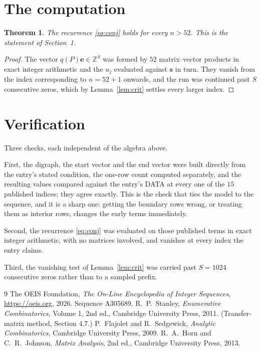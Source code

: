 \documentclass[11pt,a4paper]{article}
\theoremstyle{plain}
\newtheorem{theorem}{Theorem}
\theoremstyle{definition}
\begin{document}
\section{The computation}

\begin{theorem}
The recurrence \eqref{eq:conj} holds for every $n>52$. This is the statement of
Section~1.
\end{theorem}

\begin{proof}
The vector $q(P)\mathbf{e}\in\mathbb{Z}^{S}$ was formed by $52$ matrix--vector
products in exact integer arithmetic and the $u_j$ evaluated against $\mathbf{s}$ in turn.
They vanish from the index corresponding to $n=52+1$ onwards, and the run was continued
past $S$ consecutive zeros, which by Lemma~\ref{lem:crit} settles every larger index.
\end{proof}

\section{Verification}

Three checks, each independent of the algebra above.

First, the digraph, the start vector and the end vector were built directly from the
entry's stated condition, the one-row count computed separately, and the resulting values
compared against the entry's DATA at every one of the $15$ published indices; they
agree exactly. This is the check that ties the model to the sequence, and it is a sharp one:
getting the boundary rows wrong, or treating them as interior rows, changes the early terms
immediately.

Second, the recurrence \eqref{eq:conj} was evaluated on those published terms in exact
integer arithmetic, with no matrices involved, and vanishes at every index the entry claims.

Third, the vanishing test of Lemma~\ref{lem:crit} was carried past $S=1024$ consecutive
zeros rather than to a sampled prefix.

\begin{thebibliography}{9}
 The OEIS Foundation, \emph{The On-Line Encyclopedia of Integer
Sequences}, \url{https://oeis.org}, 2026. Sequence A305689.
 R.~P.~Stanley, \emph{Enumerative Combinatorics}, Volume 1, 2nd ed.,
Cambridge University Press, 2011. (Transfer-matrix method, Section 4.7.)
 P.~Flajolet and R.~Sedgewick, \emph{Analytic Combinatorics}, Cambridge
University Press, 2009.
 R.~A.~Horn and C.~R.~Johnson, \emph{Matrix Analysis}, 2nd ed., Cambridge
University Press, 2013.
\end{thebibliography}
\end{document}
